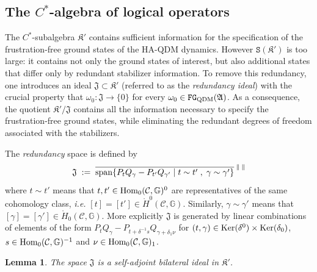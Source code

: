 \documentclass[a4paper,12pt,twoside,reqno]{amsart}
\theoremstyle{plain}
\newtheorem{lemma}[teo]{Lemma}
\theoremstyle{definition}
\theoremstyle{remark}
\numberwithin{equation}{section}
\numberwithin{figure}{section}
\numberwithin{table}{section}
\newcommand{\f}[1]{\mathcal{#1}}
\newcommand{\n}[1]{\mathbb{#1}}
\begin{document}
	\subsection{The $C^*$-algebra of logical operators}
	The $C^*$-subalgebra $\mathfrak{K}'$ contains sufficient information for the specification  of the  frustration-free ground states of the 
	{HA-QDM dynamics}. However $\mathtt{S}(\mathfrak{K}')$ is too large: it contains not only the ground states 
	of interest, but also additional states that differ only by redundant stabilizer information. To remove this redundancy, one introduces an ideal $\mathfrak{J}\subset \mathfrak{K}'$ (referred to as the \emph{redundancy ideal}) with the crucial property that $\omega_0:\mathfrak{J}\to \{0\}$ 
	for every $\omega_0\in \mathtt{FG}_{\rm QDM}(\mathfrak{A})$. As a consequence, the quotient $\mathfrak{K}'/\mathfrak{J}$ contains all the 
	information necessary to specify the frustration-free ground states, while eliminating the redundant degrees of freedom associated with the stabilizers.
	
	
	
	\medskip
	
	
	
	
	
	The \emph{redundancy}  space is defined by
	\begin{equation}\label{eq:relacion de equivalencia}
		\mathfrak{J}\;:=\;\overline{{\rm span}\{P_tQ_\gamma-P_{t'}Q_{\gamma'}\;|\; t\sim t'\;,\;\gamma\sim \gamma'\}}^{\;\|\;\|}
	\end{equation}
	where $t\sim t'$ means that $t,t'\in {\rm Hom}_0(\f{C},\n{G})^0$ are representatives of the same cohomology class, \emph{i.e.} $[t]=[t']\in\mathring{H}^0(\f{C},\n{G})$. Similarly, $\gamma\sim \gamma'$ means that
	$[\gamma]=[\gamma']\in\mathring{H}_0(\f{C},\n{G})$.
	More explicitly $ \mathfrak{J}$ is generated by linear combinations of elements of the form $P_tQ_\gamma-P_{t+\delta^{-1}s}Q_{\gamma+\delta_1\nu}$ for $(t,\gamma)\in {\rm Ker}(\delta^0)\times {\rm Ker}(\delta_0)$, $s\in {\rm Hom}_0(\f{C},\n{G})^{-1}$ and $\nu\in {\rm Hom}_0(\f{C},\n{G})_{1}$.
	
	
	
	
	
	
	
	\begin{lemma}
		The space $\mathfrak{J}$ is a self-adjoint bilateral ideal in $\mathfrak{K}'$.
	\end{lemma}
	
	
	
\end{document}
